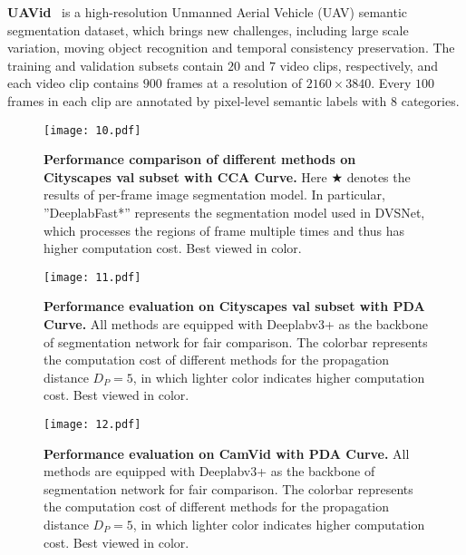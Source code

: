 \documentclass[journal]{IEEEtran}
\begin{document}
\textbf{UAVid}~\cite{lyu2020uavid} is a high-resolution Unmanned Aerial Vehicle (UAV) semantic segmentation dataset, which brings new challenges, including large scale variation, moving object recognition and temporal consistency preservation. The training and validation subsets contain $20$ and $7$ video clips, respectively, and each video clip contains $900$ frames at a resolution of $2160\times3840$. Every $100$ frames in each clip are annotated by pixel-level semantic labels with $8$ categories.



\begin{figure}[t]
	\begin{center}
		\texttt{[image: 10.pdf]}
	\end{center}
	\caption{\textbf{Performance comparison of different methods on Cityscapes val subset with CCA Curve.} Here $\bigstar$ denotes the results of per-frame image segmentation model.  In particular, ''DeeplabFast*'' represents the segmentation model used in DVSNet, which processes the regions of frame multiple times and thus has higher computation cost. Best viewed in color.}
	\label{exp_cityscapes}
\end{figure}


\begin{figure}[t]
	\begin{center}
		\texttt{[image: 11.pdf]}
	\end{center}
	\caption{\textbf{Performance evaluation on Cityscapes val subset with PDA Curve.} All methods are equipped with Deeplabv3+ as the backbone of segmentation network for fair comparison. The colorbar represents the computation cost of different methods for the propagation distance $D_P=5$, in which lighter color indicates higher computation cost. Best viewed in color.}
	\label{exp_SCM_cityscapes}
\end{figure}

\begin{figure}[t]
	\begin{center}
		\texttt{[image: 12.pdf]}
	\end{center}
	\caption{\textbf{Performance evaluation on CamVid with PDA Curve.} All methods are equipped with Deeplabv3+ as the backbone of segmentation network for fair comparison. The colorbar represents the computation cost of different methods for the propagation distance $D_P=5$, in which lighter color indicates higher computation cost. Best viewed in color.}
	\label{exp_SCM_camvid}
\end{figure}
\end{document}
